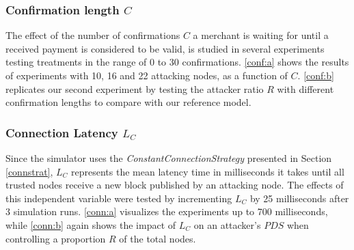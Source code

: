 \documentclass[a4paper,12pt,twoside]{report}
\begin{document}
\subsubsection{Confirmation length $C$} \label{consres}
The effect of the number of confirmations $C$ a merchant is waiting for until a received payment is considered to be valid, is studied in several experiments testing treatments in the range of 0 to 30 confirmations. \autoref{conf:a} shows the results of experiments with 10, 16 and 22 attacking nodes, as a function of $C$. \autoref{conf:b} replicates our second experiment by testing the attacker ratio $R$ with different confirmation lengths to compare with our reference model.

\subsubsection{Connection Latency $L_C$}
Since the simulator uses the \textit{ConstantConnectionStrategy} presented in Section \ref{connstrat}, $L_C$ represents the mean latency time in milliseconds it takes until all trusted nodes receive a new block published by an attacking node. The effects of this independent variable were tested by incrementing $L_C$ by 25 milliseconds after 3 simulation runs. \autoref{conn:a} visualizes the experiments up to 700 milliseconds, while \autoref{conn:b} again shows the impact of $L_C$ on an attacker's $PDS$ when controlling a proportion $R$ of the total nodes.
\end{document}
